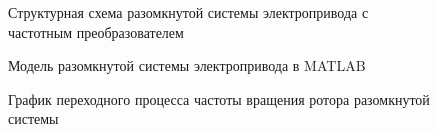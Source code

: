         \begin{figure}[h!]
            \caption{Структурная схема разомкнутой системы электропривода с
                частотным преобразователем}
            \label{fig:struct-old}
        \end{figure}

        \begin{figure}
            \caption{Модель разомкнутой системы электропривода в MATLAB}
            \label{fig:open-loop-model}
        \end{figure}
        
        \begin{figure}[h!]
            \caption{График переходного процесса частоты вращения ротора
                разомкнутой системы}
            \label{fig:open-loop-wm}
        \end{figure}

